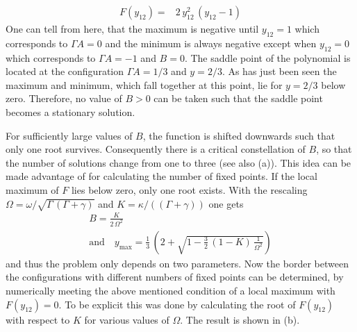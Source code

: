 \begin{align*}
    F(y_{12})%
    =&2\,y_{12}^2\,(y_{12}-1)
\end{align*}
One can tell from here, that the maximum is negative until $y_{12}=1$ which corresponds to $\Gamma A =0$ and the minimum is always negative except when $y_{12}=0$ which corresponds to $\Gamma A=-1$ and $B=0$. The saddle point of the polynomial is located at the configuration $\Gamma A=1/3$ and $y=2/3$. As has just been seen the maximum and minimum, which fall together at this point, lie for $y=2/3$ below zero. Therefore, no value of $B>0$ can be taken such that the saddle point becomes a stationary solution.  



For sufficiently large values of $B$, the function is shifted downwards such that only one root survives. Consequently there is a critical constellation of $B$, so that the number of solutions change from one to three (see also (a)). This idea can be made advantage of for calculating the number of fixed points. If the local maximum of $F$ lies below zero, only one root exists.
With the rescaling $\Omega=\omega/\sqrt{\Gamma\,(\Gamma+\gamma)}$ and $K=\kappa/((\Gamma+\gamma))$ one gets
\begin{gather*}
    B=\frac{K}{2\,\Omega^2}\\\text{and}\quad
    y_\text{max}=\frac{1}{3}\,\left( 2+ \sqrt{1-\frac{3}{2}\,(1-K)\,\frac{1}{\Omega^2}}  \right)
\end{gather*}
and thus the problem only depends on two parameters. Now the border between the configurations with different numbers of fixed points can be determined, by numerically meeting the above mentioned condition of a local maximum with $F(y_{12})=0$. To be explicit this was done by calculating the root of $F(y_{12})$ with respect to $K$ for various values of $\Omega$. The result is shown in (b).

